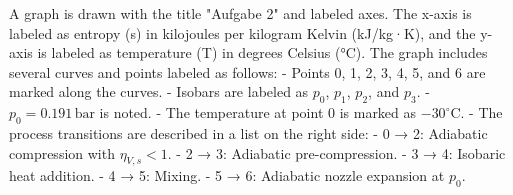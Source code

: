 A graph is drawn with the title "Aufgabe 2" and labeled axes. The x-axis is labeled as entropy (s) in kilojoules per kilogram Kelvin (kJ/kg·K), and the y-axis is labeled as temperature (T) in degrees Celsius (°C). The graph includes several curves and points labeled as follows:  
- Points 0, 1, 2, 3, 4, 5, and 6 are marked along the curves.  
- Isobars are labeled as \( p_0 \), \( p_1 \), \( p_2 \), and \( p_3 \).  
- \( p_0 = 0.191 \, \text{bar} \) is noted.  
- The temperature at point 0 is marked as \(-30^\circ \text{C}\).  
- The process transitions are described in a list on the right side:  
  - 0 → 2: Adiabatic compression with \( \eta_{V,s} < 1 \).  
  - 2 → 3: Adiabatic pre-compression.  
  - 3 → 4: Isobaric heat addition.  
  - 4 → 5: Mixing.  
  - 5 → 6: Adiabatic nozzle expansion at \( p_0 \).